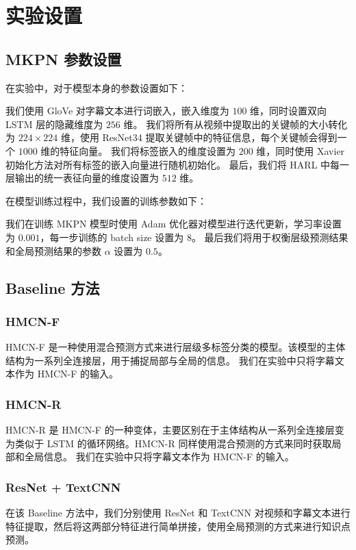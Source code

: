 \section{实验设置}
    \subsection{MKPN 参数设置}
    在实验中，对于模型本身的参数设置如下：

    我们使用 GloVe\cite{Pennington2014GloVeGV} 对字幕文本进行词嵌入，嵌入维度为 $100$ 维，同时设置双向 LSTM 层的隐藏维度为 $256$ 维。
    我们将所有从视频中提取出的关键帧的大小转化为 $224 \times 224$ 维，使用 ResNet34\cite{He2016DeepRL} 提取关键帧中的特征信息，每个关键帧会得到一个 $1000$ 维的特征向量。
    我们将标签嵌入的维度设置为 $200$ 维，同时使用 Xavier 初始化方法对所有标签的嵌入向量进行随机初始化。
    最后，我们将 HARL 中每一层输出的统一表征向量的维度设置为 $512$ 维。

    在模型训练过程中，我们设置的训练参数如下：

    我们在训练 MKPN 模型时使用 Adam\cite{Kingma2015AdamAM} 优化器对模型进行迭代更新，学习率设置为 $0.001$，每一步训练的 batch size 设置为 $8$。
    最后我们将用于权衡层级预测结果和全局预测结果的参数 $\alpha$ 设置为 $0.5$。

    \subsection{Baseline 方法}
    \subsubsection{HMCN-F\cite{Wehrmann2018HierarchicalMC}}
    HMCN-F 是一种使用混合预测方式来进行层级多标签分类的模型。该模型的主体结构为一系列全连接层，用于捕捉局部与全局的信息。
    我们在实验中只将字幕文本作为 HMCN-F 的输入。

    \subsubsection{HMCN-R\cite{Wehrmann2018HierarchicalMC}}
    HMCN-R 是 HMCN-F 的一种变体，主要区别在于主体结构从一系列全连接层变为类似于 LSTM 的循环网络。HMCN-R 同样使用混合预测的方式来同时获取局部和全局信息。
    我们在实验中只将字幕文本作为 HMCN-F 的输入。

    \subsubsection{ResNet + TextCNN\cite{He2016DeepRL, Kim2014ConvolutionalNN}}
    在该 Baseline 方法中，我们分别使用 ResNet 和 TextCNN 对视频和字幕文本进行特征提取，然后将这两部分特征进行简单拼接，使用全局预测的方式来进行知识点预测。

